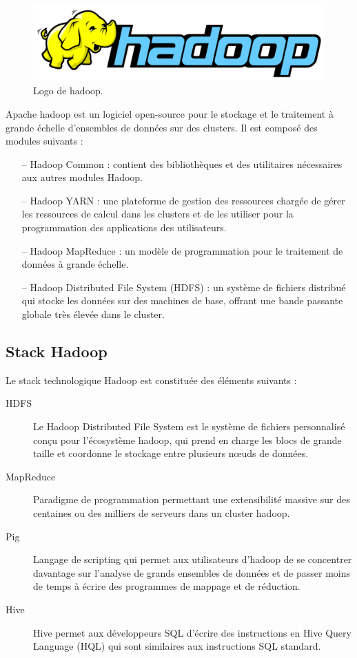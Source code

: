 \documentclass[12pt, french]{report}
\begin{document}
\begin{figure}[h]
\includegraphics[scale=0.2]{assets/img/logo-hadoop.png}
\centering
\caption{Logo de \gls{hadoop}.}
\label{fig:logo-hadoop}
\end{figure}

Apache \gls{hadoop} est un logiciel open-source pour le stockage et le traitement à grande échelle d'ensembles de données sur des clusters. Il est composé des modules suivants :
\begin{itemize}
  \item[--] Hadoop Common : contient des bibliothèques et des utilitaires nécessaires aux autres modules Hadoop.
  \item[--] Hadoop YARN : une plateforme de gestion des ressources chargée de gérer les ressources de calcul dans les clusters et de les utiliser pour la programmation des applications des utilisateurs.
  \item[--] Hadoop MapReduce : un modèle de programmation pour le traitement de données à grande échelle.
  \item[--] Hadoop Distributed File System (HDFS) : un système de fichiers distribué qui stocke les données sur des machines de base, offrant une bande passante globale très élevée dans le cluster.\\
\end{itemize}

\subsection{Stack Hadoop}

Le stack technologique Hadoop est constituée des éléments suivants :

\begin{description}
  \item[HDFS] Le Hadoop Distributed File System est le système de fichiers personnalisé conçu pour l'écosystème \gls{hadoop}, qui prend en charge les blocs de grande taille et coordonne le stockage entre plusieurs nœuds de données.
  \item[MapReduce] Paradigme de programmation permettant une extensibilité massive sur des centaines ou des milliers de serveurs dans un cluster \gls{hadoop}.
  \item[Pig] Langage de scripting qui permet aux utilisateurs d'\gls{hadoop} de se concentrer davantage sur l'analyse de grands ensembles de données et de passer moins de temps à écrire des programmes de mappage et de réduction.
  \item[Hive] Hive permet aux développeurs SQL d'écrire des instructions en Hive Query Language (HQL) qui sont similaires aux instructions SQL standard.\\
\end{description}
\end{document}

